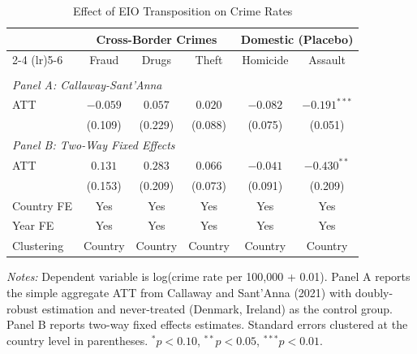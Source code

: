\begin{table}[t]
\centering
\caption{Effect of EIO Transposition on Crime Rates}
\label{tab:main}
\begin{tabular}{lccccc}
\hline\hline
 & \multicolumn{3}{c}{Cross-Border Crimes} & \multicolumn{2}{c}{Domestic (Placebo)} \\
\cmidrule(lr){2-4} \cmidrule(lr){5-6}
 & Fraud & Drugs & Theft & Homicide & Assault \\
\hline
\\[-1.8ex]
\multicolumn{6}{l}{\textit{Panel A: Callaway-Sant'Anna}} \\[0.5ex]
ATT & $-0.059$ & $0.057$ & $0.020$ & $-0.082$ & $-0.191^{***}$ \\
 & (0.109) & (0.229) & (0.088) & (0.075) & (0.051) \\[0.5ex]
\multicolumn{6}{l}{\textit{Panel B: Two-Way Fixed Effects}} \\[0.5ex]
ATT & $0.131$ & $0.283$ & $0.066$ & $-0.041$ & $-0.430^{**}$ \\
 & (0.153) & (0.209) & (0.073) & (0.091) & (0.209) \\[0.5ex]
\hline
Country FE & Yes & Yes & Yes & Yes & Yes \\
Year FE & Yes & Yes & Yes & Yes & Yes \\
Clustering & Country & Country & Country & Country & Country \\
\hline\hline
\end{tabular}
\begin{tablenotes}
\item \textit{Notes:} Dependent variable is log(crime rate per 100,000 + 0.01). Panel A reports the simple aggregate ATT from Callaway and Sant'Anna (2021) with doubly-robust estimation and never-treated (Denmark, Ireland) as the control group. Panel B reports two-way fixed effects estimates. Standard errors clustered at the country level in parentheses. $^{*}p<0.10$, $^{**}p<0.05$, $^{***}p<0.01$.
\end{tablenotes}
\end{table}
